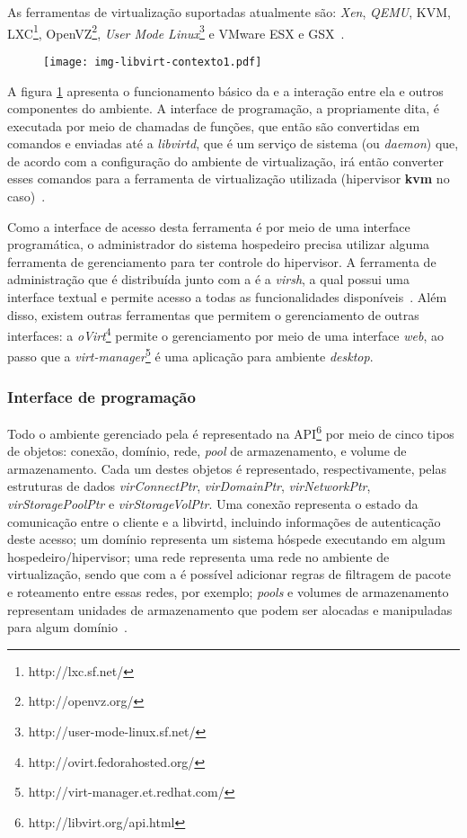 As ferramentas de virtualização suportadas atualmente são: \emph{Xen},
\emph{QEMU}, KVM, LXC\footnote{http://lxc.sf.net/},
OpenVZ\footnote{http://openvz.org/}, \emph{User Mode
Linux}\footnote{http://user-mode-linux.sf.net/} e VMware ESX e GSX~\cite{libvirtindex}.

\begin{figure}[htp]
\centering
\texttt{[image: img-libvirt-contexto1.pdf]}
\label{fig:libvirtcontexto1}
\end{figure}

A figura \ref{fig:libvirtcontexto1} apresenta o funcionamento básico da
\libvirt{} e a interação entre ela e outros componentes do ambiente. A
interface de programação, a \libvirt{} propriamente dita, é executada por meio
de chamadas de funções, que então são convertidas em comandos e enviadas até a
\emph{libvirtd}, que é um serviço de sistema (ou \emph{daemon}) que, de acordo
com a configuração do ambiente de virtualização, irá então converter esses
comandos para a ferramenta de virtualização utilizada (hipervisor \textbf{kvm}
no caso)~\cite{bolte2010non}.

Como a interface de acesso desta ferramenta é por meio de uma interface
programática, o administrador do sistema hospedeiro precisa
utilizar alguma ferramenta de gerenciamento para ter controle do hipervisor. A
ferramenta de administração que é distribuída junto com a \libvirt{} é a
\emph{virsh}, a qual possui uma interface textual e permite acesso a todas as
funcionalidades disponíveis~\cite{virsh2008asilva}. Além disso, existem outras
ferramentas que permitem o gerenciamento de outras interfaces: a
\emph{oVirt}\footnote{http://ovirt.fedorahosted.org/} permite o
gerenciamento por meio de uma interface \emph{web}, ao passo que a
\emph{virt-manager}\footnote{http://virt-manager.et.redhat.com/} é uma
aplicação para ambiente \emph{desktop}.

\subsubsection{Interface de programação}\label{sec:libvirtapi}

Todo o ambiente gerenciado pela \libvirt{} é representado na
API\footnote{http://libvirt.org/api.html} por meio de cinco tipos de
objetos: conexão, domínio, rede, \emph{pool} de armazenamento, e volume de
armazenamento. Cada um destes objetos é representado, respectivamente, pelas
estruturas de dados \emph{virConnectPtr}, \emph{virDomainPtr},
\emph{virNetworkPtr}, \emph{virStoragePoolPtr} e \emph{virStorageVolPtr}. Uma
conexão representa o estado da comunicação entre o cliente e a
libvirtd, incluindo informações de autenticação deste acesso; um
domínio representa um sistema hóspede executando em algum
hospedeiro/hipervisor; uma rede representa uma rede no ambiente de
virtualização, sendo que com a \libvirt{} é possível adicionar regras de filtragem de
pacote e roteamento entre essas redes, por exemplo; \emph{pools} e volumes de
armazenamento representam unidades de armazenamento que podem ser alocadas e
manipuladas para algum domínio~\cite{libvirtapi}.

